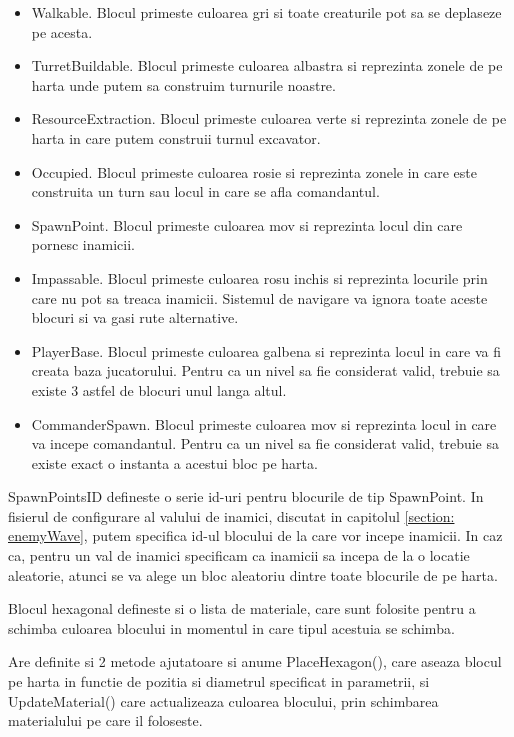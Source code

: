 \documentclass[12pt, a4paper]{article}
\begin{document}
	\begin{itemize}
		\item Walkable. Blocul primeste culoarea gri si toate creaturile pot sa se deplaseze pe acesta.
		\item TurretBuildable. Blocul primeste culoarea albastra si reprezinta zonele de pe harta unde putem sa construim turnurile noastre.
		\item ResourceExtraction. Blocul primeste culoarea verte si reprezinta zonele de pe harta in care putem construii turnul excavator.
		\item Occupied. Blocul primeste culoarea rosie si reprezinta zonele in care este construita un turn sau locul in care se afla comandantul.
		\item SpawnPoint. Blocul primeste culoarea mov si reprezinta locul din care pornesc inamicii.
		\item Impassable. Blocul primeste culoarea rosu inchis si reprezinta locurile prin care nu pot sa treaca inamicii. Sistemul de navigare va ignora toate aceste blocuri si va gasi rute alternative.
		\item PlayerBase. Blocul primeste culoarea galbena si reprezinta locul in care va fi creata baza jucatorului. Pentru ca un nivel sa fie considerat valid, trebuie sa existe 3 astfel de blocuri unul langa altul.
		\item CommanderSpawn. Blocul primeste culoarea mov si reprezinta locul in care va incepe comandantul. Pentru ca un nivel sa fie considerat valid, trebuie sa existe exact o instanta a acestui bloc pe harta.
	\end{itemize}
	
	SpawnPointsID defineste o serie id-uri pentru blocurile de tip SpawnPoint. In fisierul de configurare al valului de inamici, discutat in capitolul \ref{section: enemyWave}, putem specifica id-ul blocului de la care vor incepe inamicii. In caz ca, pentru un val de inamici specificam ca inamicii sa incepa de la o locatie aleatorie, atunci se va alege un bloc aleatoriu dintre toate blocurile de pe harta.
	\newline
	
	Blocul hexagonal defineste si o lista de materiale, care sunt folosite pentru a schimba culoarea blocului in momentul in care tipul acestuia se schimba.
	\newline
	
	Are definite si 2 metode ajutatoare si anume PlaceHexagon(), care aseaza blocul pe harta in functie de pozitia si diametrul specificat in parametrii, si UpdateMaterial() care actualizeaza culoarea blocului, prin schimbarea materialului pe care il foloseste.
	\newline
	
\end{document}
